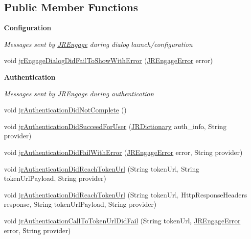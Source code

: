 \subsection*{Public Member Functions}
\begin{Indent}{\bf Configuration}\par
{\em \label{_amgrp254f642527b45bc260048e30704edb39}
 Messages sent by \hyperlink{classcom_1_1janrain_1_1android_1_1engage_1_1_j_r_engage}{JREngage} during dialog launch/configuration }\begin{DoxyCompactItemize}
\item 
void \hyperlink{interfacecom_1_1janrain_1_1android_1_1engage_1_1_j_r_engage_delegate_ae5264ff26bf62b438bd515b89992a791}{jrEngageDialogDidFailToShowWithError} (\hyperlink{classcom_1_1janrain_1_1android_1_1engage_1_1_j_r_engage_error}{JREngageError} error)
\end{DoxyCompactItemize}
\end{Indent}
\begin{Indent}{\bf Authentication}\par
{\em \label{_amgrpc75f7811d70d17dbcd88e9d03752cbed}
 Messages sent by \hyperlink{classcom_1_1janrain_1_1android_1_1engage_1_1_j_r_engage}{JREngage} during authentication }\begin{DoxyCompactItemize}
\item 
void \hyperlink{interfacecom_1_1janrain_1_1android_1_1engage_1_1_j_r_engage_delegate_a35d1b7a0d67a7f011c0c168cdae7fa4b}{jrAuthenticationDidNotComplete} ()
\item 
void \hyperlink{interfacecom_1_1janrain_1_1android_1_1engage_1_1_j_r_engage_delegate_ab629bcee7bdbdeaa868460d82361733d}{jrAuthenticationDidSucceedForUser} (\hyperlink{classcom_1_1janrain_1_1android_1_1engage_1_1types_1_1_j_r_dictionary}{JRDictionary} auth\_\-info, String provider)
\item 
void \hyperlink{interfacecom_1_1janrain_1_1android_1_1engage_1_1_j_r_engage_delegate_acadedbc321eb7e99ed43083ebb735c11}{jrAuthenticationDidFailWithError} (\hyperlink{classcom_1_1janrain_1_1android_1_1engage_1_1_j_r_engage_error}{JREngageError} error, String provider)
\item 
void \hyperlink{interfacecom_1_1janrain_1_1android_1_1engage_1_1_j_r_engage_delegate_a05fef4cfe88d741dcacb807d1d70649b}{jrAuthenticationDidReachTokenUrl} (String tokenUrl, String tokenUrlPayload, String provider)
\item 
void \hyperlink{interfacecom_1_1janrain_1_1android_1_1engage_1_1_j_r_engage_delegate_a80bb026a7d556d87527c5069f4f50350}{jrAuthenticationDidReachTokenUrl} (String tokenUrl, HttpResponseHeaders response, String tokenUrlPayload, String provider)
\item 
void \hyperlink{interfacecom_1_1janrain_1_1android_1_1engage_1_1_j_r_engage_delegate_acabfa7954d433d8af43ce7d5d78c4b5e}{jrAuthenticationCallToTokenUrlDidFail} (String tokenUrl, \hyperlink{classcom_1_1janrain_1_1android_1_1engage_1_1_j_r_engage_error}{JREngageError} error, String provider)
\end{DoxyCompactItemize}
\end{Indent}
